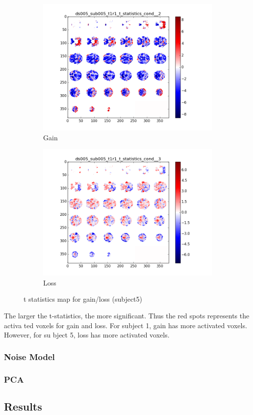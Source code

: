 \begin{figure}[H]
\begin{subfigure}{.5\textwidth}
  \centering
  \includegraphics[width=.8\linewidth]{../fig/t_test/ds005_sub005_t1r1_t-test_cond2.png}
  \caption{Gain}
  \label{fig:sfig1}
\end{subfigure}%
\begin{subfigure}{.5\textwidth}
  \centering
  \includegraphics[width=.8\linewidth]{../fig/t_test/ds005_sub005_t1r1_t-test_cond3.png}
  \caption{Loss}
  \label{fig:sfig2}
\end{subfigure}
\caption{t statistics map for gain/loss (subject5)}
\label{fig:fig}
\end{figure}
\noindent
The larger the t-statistics, the more significant. Thus the red spots represents the activa
ted voxels for gain and loss. For subject 1, gain has more activated voxels. However, for su
bject 5, loss has more activated voxels.

\subsubsection {Noise Model}

\subsubsection {PCA}

\subsection {Results}



